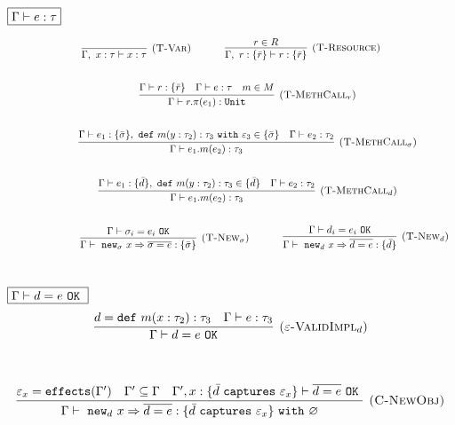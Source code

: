 \documentclass{llncs}
\newcommand{\keywadj}[1]{\mathtt{#1}}
\newcommand{\keyw}[1]{\keywadj{#1}~}
\begin{document}
$\fbox{$\Gamma \vdash e : \tau$}$

\[
\begin{array}{c}
\infer[\textsc{(T-Var)}]
	{\Gamma,~x : \tau \vdash x : \tau}
	{}
~~~~~~~~~~
\infer[\textsc{(T-Resource)}]
	{\Gamma,~r : \{ \bar r \} \vdash r : \{ \bar r \}}
	{r \in R} \\[5ex]
~~~~~~~~~~
\infer[\textsc{(T-MethCall$_r$)}]
	{\Gamma \vdash r.\pi(e_1) : \keywadj{Unit}}
	{\Gamma \vdash r : \{ \bar r \} & \Gamma \vdash e : \tau & m \in M} \\[5ex]
~~~~~~~~~~
\infer[\textsc{(T-MethCall$_\sigma$)}]
	{\Gamma \vdash e_1.m(e_2) : \tau_3}
	{\Gamma \vdash e_1 : \{ \bar \sigma \},~\keyw{def} m(y : \tau_2) : \tau_3~\keyw{with} \varepsilon_3 \in \{ \bar \sigma \} &  \Gamma \vdash e_2 : \tau_2 }\\[5ex]
~~~~~~~~~~
\infer[\textsc{(T-MethCall$_d$)}]
	{\Gamma \vdash e_1.m(e_2) : \tau_3}
	{\Gamma \vdash e_1 : \{ \bar d\},~\keyw{def} m(y : \tau_2) : \tau_3 \in \{ \bar d \} &  \Gamma \vdash e_2 : \tau_2 }\\[5ex]
~~~~~~~~~~

~~~~~~~~~~
\infer[\textsc{(T-New$_\sigma$)}]
	{\Gamma \vdash~\keywadj{new}_\sigma~x \Rightarrow \overline{\sigma = e} : \{ \bar \sigma \}}
	{\Gamma \vdash \sigma_i = e_i~\keywadj{OK}}
~~~~~~~~~~
\infer[\textsc{(T-New$_d$)}]
	{\Gamma \vdash~\keywadj{new}_d~x \Rightarrow \overline{d = e} : \{ \bar d \}}
	{\Gamma \vdash d_i = e_i~\keywadj{OK}}\\[5ex]
\end{array}
\]

$\fbox{$\Gamma \vdash d = e~\keyw{OK}$}$
\[
\begin{array}{c}
\infer[\textsc{($\varepsilon$-ValidImpl$_d$)}]
	{\Gamma \vdash d = e~\keywadj{OK}}
	{d = \keyw{def} m(x : \tau_2) : \tau_3 & \Gamma \vdash e : \tau_3}
	\\[5ex]
\end{array}
\]

\fbox{$\Gamma \vdash e : \tau~\keyw{with} \varepsilon$}

\[
\begin{array}{c}
\infer[\textsc{(C-NewObj)}]
	{\Gamma \vdash~\keywadj{new}_d~x \Rightarrow \overline{d = e} : \{  \bar d~\keyw{captures} \varepsilon_x \} ~\keyw{with} \varnothing }
	{\varepsilon_x = \keywadj{effects}(\Gamma') & \Gamma' \subseteq \Gamma & \Gamma', x : \{ \bar d~\keyw {captures} \varepsilon_x \} \vdash \overline{d = e}~\keyw{OK}} \\[5ex]
\end{array}
\]
\end{document}
